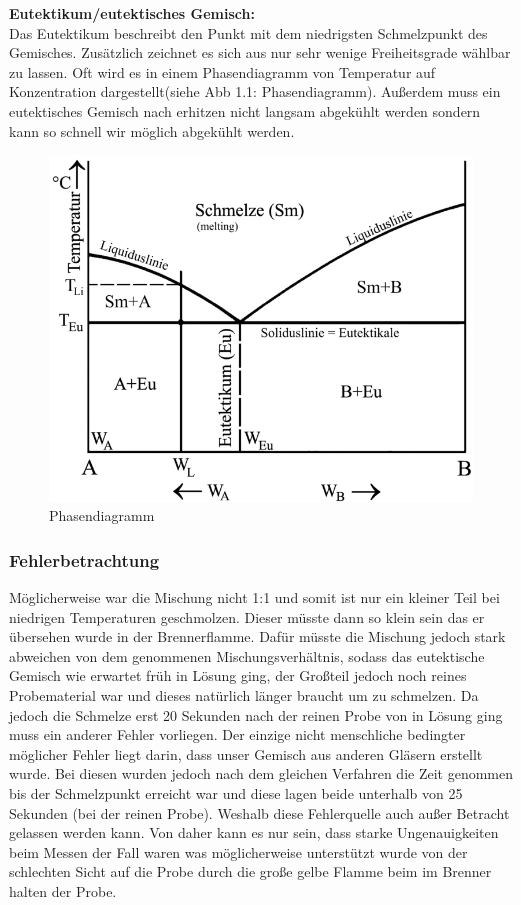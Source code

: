 \documentclass{scrartcl}
\begin{document}
\textbf{Eutektikum/eutektisches Gemisch:}\\
Das Eutektikum beschreibt den Punkt mit dem niedrigsten Schmelzpunkt des Gemisches. Zusätzlich zeichnet es sich aus nur sehr wenige Freiheitsgrade wählbar zu lassen. Oft wird es in einem Phasendiagramm von Temperatur auf Konzentration dargestellt(siehe Abb 1.1: Phasendiagramm). Außerdem muss ein eutektisches Gemisch nach erhitzen nicht langsam abgekühlt werden sondern kann so schnell wir möglich abgekühlt werden.
\begin{figure} 
  \centering
  \caption{Phasendiagramm\protect\footnotemark}
     \includegraphics[width=.75\textwidth]{Phasendiagramm.png}
\end{figure}
\subsubsection{Fehlerbetrachtung}
Möglicherweise war die Mischung nicht 1:1 und somit ist nur ein kleiner Teil bei niedrigen Temperaturen geschmolzen. Dieser müsste dann so klein sein das er übersehen wurde in der Brennerflamme. Dafür müsste die Mischung jedoch stark abweichen von dem genommenen Mischungsverhältnis, sodass das eutektische Gemisch wie erwartet früh in Lösung ging, der Großteil jedoch noch reines Probematerial war und dieses natürlich länger braucht um zu schmelzen. Da jedoch die Schmelze erst 20 Sekunden nach der reinen Probe von  in Lösung ging muss ein anderer Fehler vorliegen. Der einzige nicht menschliche bedingter möglicher Fehler liegt darin, dass unser Gemisch aus anderen Gläsern erstellt wurde. Bei diesen wurden jedoch nach dem gleichen Verfahren die Zeit genommen bis der Schmelzpunkt erreicht war und diese lagen beide unterhalb von 25 Sekunden (bei der reinen Probe). Weshalb diese Fehlerquelle auch außer Betracht gelassen werden kann. Von daher kann es nur sein, dass starke Ungenauigkeiten beim Messen der Fall waren was möglicherweise unterstützt wurde von der schlechten Sicht auf die Probe durch die große gelbe Flamme beim im Brenner halten der Probe.
\end{document}
